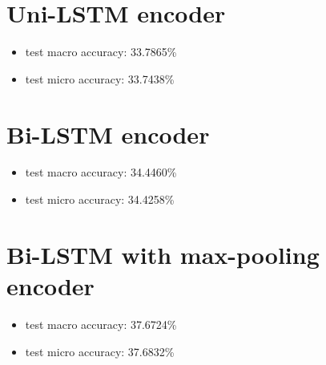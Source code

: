 \documentclass[6pt]{article}
\begin{document}
\section{Uni-LSTM encoder}

\begin{itemize}
  \item test macro accuracy: 33.7865\%
  
  \item test micro accuracy: 33.7438\%
\end{itemize}

\section{Bi-LSTM encoder}

\begin{itemize}
  \item test macro accuracy: 34.4460\%
  
  \item test micro accuracy: 34.4258\%
\end{itemize}

\section{Bi-LSTM with max-pooling encoder}

\begin{itemize}
  \item test macro accuracy: 37.6724\%
  
  \item test micro accuracy: 37.6832\%
\end{itemize}
\end{document}
